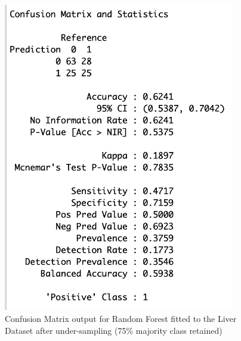 \begin{figure}[!htbp]
\begin{minipage}{0.45\textwidth}
        \includegraphics[width=0.9\textwidth]{ThesisTemplate/appendix/images/Chapter5Appendix/ConfusionMatrix75/Liver.png}
        \caption{Confusion Matrix output for Random Forest fitted to the Liver Dataset after under-sampling (75\% majority class retained)}
        \label{fig:matrixLiver75}
    \end{minipage}
\end{figure}

